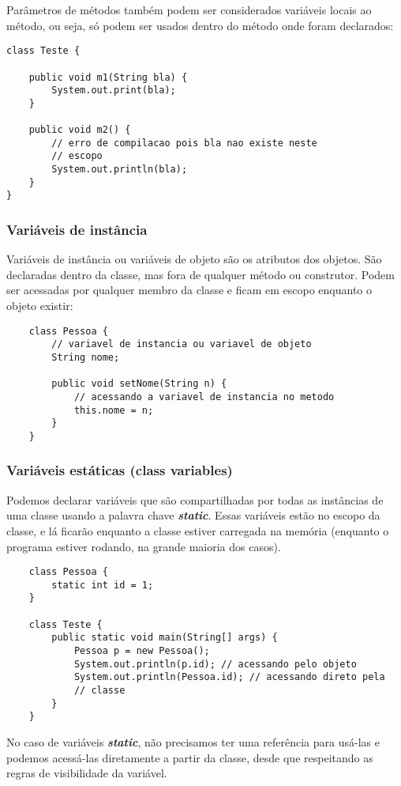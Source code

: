 \documentclass[12pt]{report}
\begin{document}
Parâmetros de métodos também podem ser considerados variáveis locais ao método, ou seja, só podem ser usados dentro do método onde foram declarados:

\begin{lstlisting}
class Teste {
	
	public void m1(String bla) {
		System.out.print(bla);
	}
	
	public void m2() {
		// erro de compilacao pois bla nao existe neste
		// escopo
		System.out.println(bla);
	}
}
\end{lstlisting}

\subsubsection*{Variáveis de instância}

Variáveis de instância ou variáveis de objeto são os atributos dos objetos. São declaradas dentro da classe, mas fora de qualquer método ou construtor. Podem ser acessadas por qualquer membro da classe e ficam em escopo enquanto o objeto existir:

\begin{lstlisting}
	class Pessoa {
		// variavel de instancia ou variavel de objeto
		String nome;
		
		public void setNome(String n) {
			// acessando a variavel de instancia no metodo
			this.nome = n;
		}
	}
\end{lstlisting}

\subsubsection*{Variáveis estáticas (class variables)}

Podemos declarar variáveis que são compartilhadas por todas as instâncias de uma classe usando a palavra chave \textbf{\textit{static}}. Essas variáveis estão no escopo da classe, e lá ficarão enquanto a classe estiver carregada na memória (enquanto o programa estiver rodando, na grande maioria dos casos).

\begin{lstlisting}
	class Pessoa {
		static int id = 1;
	}
	
	class Teste {
		public static void main(String[] args) {
			Pessoa p = new Pessoa();
			System.out.println(p.id); // acessando pelo objeto
			System.out.println(Pessoa.id); // acessando direto pela
			// classe
		}
	}
\end{lstlisting}

No caso de variáveis \textbf{\textit{static}}, não precisamos ter uma referência para usá-las e podemos acessá-las diretamente a partir da classe, desde que respeitando as regras de visibilidade da variável.
\end{document}
